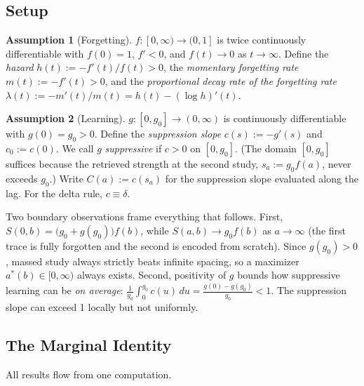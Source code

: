 \documentclass[man, 12pt, floatsintext]{apa6}
\theoremstyle{definition}
\newtheorem{assumption}{Assumption}
\theoremstyle{remark}
\begin{document}
\subsection{Setup}

\begin{assumption}[Forgetting]\label{ass:f}
$f:[0,\infty)\to(0,1]$ is twice continuously differentiable with $f(0)=1$, $f'<0$, and $f(t)\to 0$ as $t\to\infty$. Define the \emph{hazard} $h(t) := -f'(t)/f(t) > 0$, the \emph{momentary forgetting rate} $m(t) := -f'(t) > 0$, and the \emph{proportional decay rate of the forgetting rate} $\lambda(t) := -m'(t)/m(t) = h(t) - (\log h)'(t)$.
\end{assumption}

\begin{assumption}[Learning]\label{ass:g}
$g:[0,g_0]\to(0,\infty)$ is continuously differentiable with $g(0) = g_0 > 0$. Define the \emph{suppression slope} $c(s) := -g'(s)$ and $c_0 := c(0)$. We call $g$ \emph{suppressive} if $c > 0$ on $[0,g_0]$. (The domain $[0,g_0]$ suffices because the retrieved strength at the second study, $s_a := g_0 f(a)$, never exceeds $g_0$.) Write $C(a) := c(s_a)$ for the suppression slope evaluated along the lag. For the delta rule, $c \equiv \delta$.
\end{assumption}

Two boundary observations frame everything that follows. First, $S(0,b) = \big(g_0 + g(g_0)\big) f(b)$, while $S(a,b) \to g_0 f(b)$ as $a\to\infty$ (the first trace is fully forgotten and the second is encoded from scratch). Since $g(g_0) > 0$, massed study always strictly beats infinite spacing, so a maximizer $a^*(b) \in [0,\infty)$ always exists. Second, positivity of $g$ bounds how suppressive learning can be \emph{on average}: $\frac{1}{g_0}\int_0^{g_0} c(u)\,du = \frac{g(0)-g(g_0)}{g_0} < 1$. The suppression slope can exceed 1 locally but not uniformly.

\subsection{The Marginal Identity}

All results flow from one computation.
\end{document}
